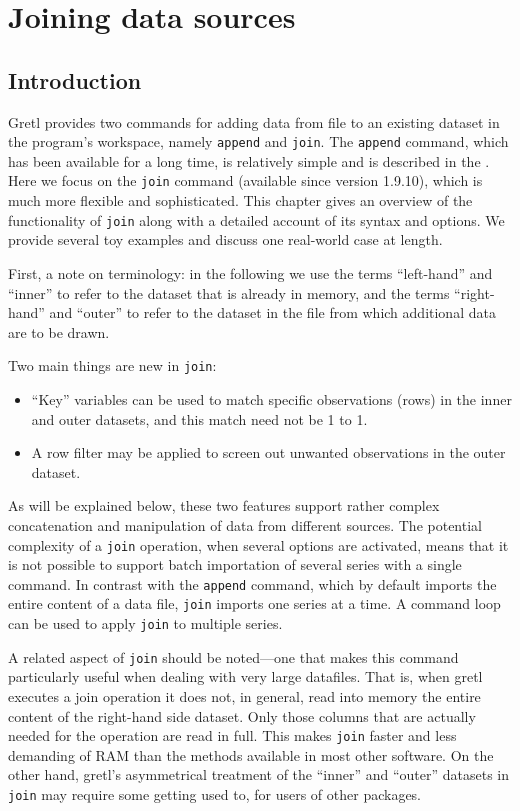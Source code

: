 \chapter{Joining data sources}
\label{chap:join}

\section{Introduction}

Gretl provides two commands for adding data from file to an existing
dataset in the program's workspace, namely \texttt{append} and
\texttt{join}. The \texttt{append} command, which has been available
for a long time, is relatively simple and is described in the
\GCR. Here we focus on the \texttt{join} command (available since
version 1.9.10), which is much more flexible and sophisticated. This
chapter gives an overview of the functionality of \texttt{join} along
with a detailed account of its syntax and options. We provide several
toy examples and discuss one real-world case at length.

First, a note on terminology: in the following we use the terms 
``left-hand'' and ``inner'' to refer to the dataset that is already in
memory, and the terms ``right-hand'' and ``outer'' to refer to the
dataset in the file from which additional data are to be drawn. 

Two main things are new in \texttt{join}: 
\begin{itemize}
\item ``Key'' variables can be used to match specific observations
  (rows) in the inner and outer datasets, and this match need not be
  1 to 1.
\item A row filter may be applied to screen out unwanted observations
  in the outer dataset.
\end{itemize}

As will be explained below, these two features support rather complex
concatenation and manipulation of data from different sources. The
potential complexity of a \texttt{join} operation, when several
options are activated, means that it is not possible to support batch
importation of several series with a single command. In contrast with
the \texttt{append} command, which by default imports the entire
content of a data file, \texttt{join} imports one series at a time. A
command loop can be used to apply \texttt{join} to multiple series.

A related aspect of \texttt{join} should be noted---one that makes
this command particularly useful when dealing with very large
datafiles.  That is, when gretl executes a join operation it does not,
in general, read into memory the entire content of the right-hand side
dataset.  Only those columns that are actually needed for the
operation are read in full. This makes \texttt{join} faster and
less demanding of RAM than the methods available in most other
software. On the other hand, gretl's asymmetrical treatment of the
``inner'' and ``outer'' datasets in \texttt{join} may require some
getting used to, for users of other packages.

